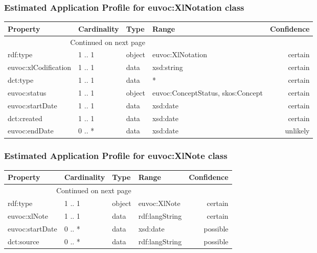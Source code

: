 \documentclass[10pt,a4paper,titlepage,final]{article}
\begin{document}
\subsubsection{Estimated Application Profile for euvoc:XlNotation class}
\begin{tabularx}{\textwidth}{lllXr}
\toprule
             Property & Cardinality &    Type &                              Range & Confidence \\
\midrule
\endhead
\midrule
\multicolumn{3}{r}{{Continued on next page}} \\
\midrule
\endfoot

\bottomrule
\endlastfoot
             rdf:type &      1 .. 1 &  object &                   euvoc:XlNotation &    certain \\
 euvoc:xlCodification &      1 .. 1 &    data &                         xsd:string &    certain \\
             dct:type &      1 .. 1 &    data &                                  * &    certain \\
         euvoc:status &      1 .. 1 &  object &  euvoc:ConceptStatus, skos:Concept &    certain \\
      euvoc:startDate &      1 .. 1 &    data &                           xsd:date &    certain \\
          dct:created &      1 .. 1 &    data &                           xsd:date &    certain \\
        euvoc:endDate &      0 .. * &    data &                           xsd:date &   unlikely \\
\end{tabularx}


\subsubsection{Estimated Application Profile for euvoc:XlNote class}
\begin{tabularx}{\textwidth}{lllXr}
\toprule
        Property & Cardinality &    Type &           Range & Confidence \\
\midrule
\endhead
\midrule
\multicolumn{3}{r}{{Continued on next page}} \\
\midrule
\endfoot

\bottomrule
\endlastfoot
        rdf:type &      1 .. 1 &  object &    euvoc:XlNote &    certain \\
    euvoc:xlNote &      1 .. 1 &    data &  rdf:langString &    certain \\
 euvoc:startDate &      0 .. * &    data &        xsd:date &   possible \\
      dct:source &      0 .. * &    data &  rdf:langString &   possible \\
\end{tabularx}
\end{document}
